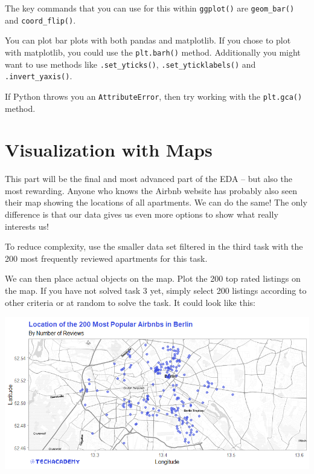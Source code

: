 \documentclass[
  11pt,
]{book}
\newenvironment{tips}[1]
  {
  \begin{itemize}
  \footnotesize
  \renewcommand{\labelitemi}{
    \raisebox{-.7\height}[0pt][0pt]{
      {\setkeys{Gin}{width=3em,keepaspectratio}
        \texttt{[image: images/\#1.png]}}
    }
  }
  \setlength{\fboxsep}{1em}
  \begin{rbox}
  \item
  }
  {
  \end{rbox}
  \end{itemize}
  }
\newenvironment{tipsp}[1]
  {
  \begin{itemize}
  \footnotesize
  \renewcommand{\labelitemi}{
    \raisebox{-.7\height}[0pt][0pt]{
      {\setkeys{Gin}{width=3em,keepaspectratio}
        \texttt{[image: images/\#1.png]}}
    }
  }
  \setlength{\fboxsep}{1em}
  \begin{pbox}
  \item
  }
  {
  \end{pbox}
  \end{itemize}
  }
\begin{document}
\begin{tips}r

The key commands that you can use for this within \texttt{ggplot()} are \texttt{geom\_bar()} and \texttt{coord\_flip()}.

\end{tips}

\begin{tipsp}p

You can plot bar plots with both pandas and matplotlib.
If you chose to plot with matplotlib, you could use the \texttt{plt.barh()} method. Additionally you might want to use methods like \texttt{.set\_yticks()}, \texttt{.set\_yticklabels()} and \texttt{.invert\_yaxis()}.

If Python throws you an \texttt{AttributeError}, then try working with the \texttt{plt.gca()} method.

\end{tipsp}

\hypertarget{visualization-with-maps}{%
\section{Visualization with Maps}\label{visualization-with-maps}}

This part will be the final and most advanced part of the EDA -- but also the most rewarding. Anyone who knows the Airbnb website has probably also seen their map showing the locations of all apartments. We can do the same! The only difference is that our data gives us even more options to show what really interests us!

To reduce complexity, use the smaller data set filtered in the third task with the 200 most frequently reviewed apartments for this task.

We can then place actual objects on the map. Plot the 200 top rated listings on the map. If you have not solved task 3 yet, simply select 200 listings according to other criteria or at random to solve the task. It could look like this:

\begin{center}\includegraphics[width=1\linewidth]{plot/4_1_map_top200_simple} \end{center}
\end{document}
